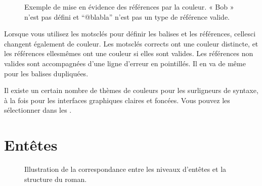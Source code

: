 \documentclass[a4paper,11pt,french]{sphinxmanual}
\begin{document}
\begin{figure}[htbp]
\centering
\capstart

\noindent{}
\caption{Exemple de mise en évidence des références par la couleur. « Bob » n’est pas défini et “@blabla” n’est pas un type de référence valide.}\label{\detokenize{usage_format:id1}}\end{figure}

\sphinxAtStartPar
Lorsque vous utilisez les mots\sphinxhyphen{}clés pour définir les balises et les références, celles\sphinxhyphen{}ci changent également de couleur. Les mots\sphinxhyphen{}clés corrects ont une couleur distincte, et les références elles\sphinxhyphen{}mêmes ont une couleur si elles sont valides. Les références non valides sont accompagnées d’une ligne d’erreur en pointillés. Il en va de même pour les balises dupliquées.

\sphinxAtStartPar
Il existe un certain nombre de thèmes de couleurs pour les surligneurs de syntaxe, à la fois pour les interfaces graphiques claires et foncées. Vous pouvez les sélectionner dans les .


\section{En\sphinxhyphen{}têtes}
\label{\detokenize{usage_format:headings}}\label{\detokenize{usage_format:a-fmt-head}}
\begin{figure}[htbp]
\centering
\capstart

\noindent{}
\caption{Illustration de la correspondance entre les niveaux d’en\sphinxhyphen{}têtes et la structure du roman.}\label{\detokenize{usage_format:id2}}\end{figure}
\end{document}
